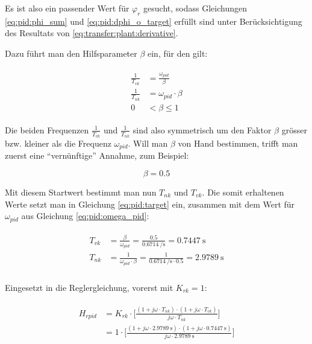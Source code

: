 Es ist also  ein passender Wert f\"ur $\varphi_r$  gesucht, sodass Gleichungen
\ref{eq:pid:phi_sum}  und  \ref{eq:pid:dphi_o_target}   erf\"ullt  sind  unter
Ber\"ucksichtigung des Resultats von \ref{eq:transfer:plant:derivative}.

Dazu f\"uhrt man den Hilfsparameter $\beta$ ein, f\"ur den gilt:


\begin{gather} \label{eq:pid:beta:start}
    \begin{split}
        \frac{1}{T_{vk}} & = \frac{\omega_{pid}}{\beta} \\
        \frac{1}{T_{nk}} & = \omega_{pid} \cdot \beta  \\
                       0 & <  \beta \leq 1
    \end{split}
\end{gather}

Die  beiden Frequenzen  $\frac{1}{T_{vk}}$  und  $\frac{1}{T_{nk}}$ sind  also
symmetrisch  um den  Faktor $\beta$  gr\"osser bzw.  kleiner als  die Frequenz
$\omega_{pid}$.  Will man  $\beta$ von Hand bestimmen, trifft
man zuerst eine ``vern\"unftige'' Annahme, zum Beispiel:

\begin{equation} \label{eq:pid:beta:initial_value}
    \beta = 0.5
\end{equation}

Mit  diesem Startwert  bestimmt  man nun  $T_{nk}$  und ${T_{vk}}$. Die  somit
erhaltenen Werte setzt man in  Gleichung \ref{eq:pid:target} ein, zusammen mit
dem Wert f\"ur $\omega_{pid}$ aus Gleichung \ref{eq:pid:omega_pid}:

\begin{gather} \label{eq:pid:t_nk_t_vk_initial_results}
    \begin{split}
        {T_{vk}} & = \frac{\beta}{\omega_{pid}}  = \frac{0.5}{\SI{0.6714}{\per\second}}                   = \SI{0.7447}{\second} \\
        {T_{nk}} & = \frac{1}{\omega_{pid} \cdot \beta} = \frac{1}{\SI{0.6714}{\per\second} \cdot 0.5 }  = \SI{2.9789}{\second} \\
    \end{split}
\end{gather}

Eingesetzt in die Reglergleichung, vorerst mit $K_{rk} = 1$:

\begin{gather} \label{eq:pid:t_nk_t_vk_initial_results}
    \begin{split}
        H_{rpid} & = K_{rk} \cdot \biggl[ \frac{(1 + j\omega \cdot T_{nk}) \cdot (1 + j\omega \cdot T_{vk}) }{ j\omega \cdot T_{nk} } \biggr] \\
                 & = 1      \cdot \biggl[ \frac{(1 + j\omega \cdot \SI{2.9789}{\second}) \cdot (1 + j\omega \cdot \SI{0.7447}{\second}) }{ j\omega \cdot  \SI{2.9789}{\second}} \biggr]
    \end{split}
\end{gather}

